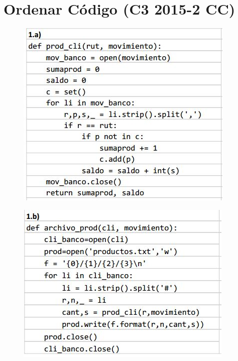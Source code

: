 \section{Ordenar Código (C3 2015-2 CC)}
\begin{figure}[h]
    \centering
    \includegraphics[scale=0.6]{Imagenes/imagena.jpg}
\end{figure}

\begin{figure}[h]
    \centering
    \includegraphics[scale=0.6]{Imagenes/imagenb.jpg}
\end{figure}
